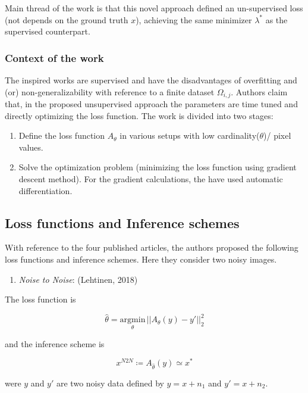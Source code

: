 \documentclass[
]{agujournal2019}
\providecommand{\tightlist}{%
  \setlength{\itemsep}{0pt}\setlength{\parskip}{0pt}}\usepackage{longtable,booktabs,array}
\begin{document}
Main thread of the work is that this novel approach defined an
un-supervised loss (not depends on the ground truth \(x\)), achieving
the same minimizer \(\lambda^*\) as the supervised counterpart.

\subsubsection{Context of the work}\label{context-of-the-work}

The inspired works are supervised and have the disadvantages of
overfitting and (or) non-generalizability with reference to a finite
dataset \(\Omega_{i,j}\). Authors claim that, in the proposed
unsupervised approach the parameters are time tuned and directly
optimizing the loss function. The work is divided into two stages:

\begin{enumerate}
\def\labelenumi{\arabic{enumi}.}
\tightlist
\item
  Define the loss function \(A_\theta\) in various setups with low
  cardinality(\(\theta\))/ pixel values.
\item
  Solve the optimization problem (minimizing the loss function using
  gradient descent method). For the gradient calculations, the have used
  automatic differentiation.
\end{enumerate}

\subsection{Loss functions and Inference
schemes}\label{loss-functions-and-inference-schemes}

With reference to the four published articles, the authors proposed the
following loss functions and inference schemes. Here they consider two
noisy images.

\begin{enumerate}
\def\labelenumi{\arabic{enumi}.}
\tightlist
\item
  \emph{Noise to Noise}: (Lehtinen, 2018)
\end{enumerate}

The loss function is

\[ \hat{\theta}=\underset{\theta}{\mathrm{argmin}}\, ||A_\theta (y)-y'||^2_2\]

and the inference scheme is

\[x^{N2N}\coloneqq A_{\hat{\theta}}(y)\simeq x^*\]

were \(y\) and \(y'\) are two noisy data defined by \(y=x+n_1\) and
\(y'=x+n_2\).
\end{document}
